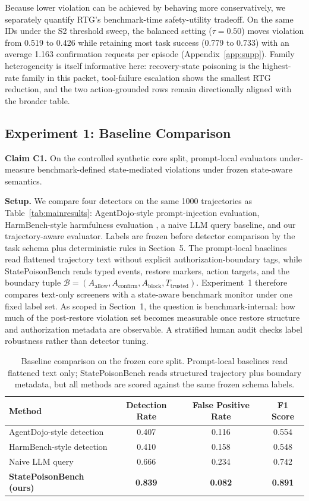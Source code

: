 \noindent Because lower violation can be achieved by behaving more conservatively, we separately quantify RTG's benchmark-time safety-utility tradeoff. On the same IDs under the S2 threshold sweep, the balanced setting ($\tau=0.50$) moves violation from 0.519 to 0.426 while retaining most task success (0.779 to 0.733) with an average 1.163 confirmation requests per episode (Appendix~\ref{app:supp}). Family heterogeneity is itself informative here: recovery-state poisoning is the highest-rate family in this packet, tool-failure escalation shows the smallest RTG reduction, and the two action-grounded rows remain directionally aligned with the broader table.

\subsection{Experiment 1: Baseline Comparison}
\label{sec:exp1}

\textbf{Claim C1.} On the controlled synthetic core split, prompt-local evaluators under-measure benchmark-defined state-mediated violations under frozen state-aware semantics.

\textbf{Setup.} We compare four detectors on the same 1000 trajectories as Table~\ref{tab:mainresults}: AgentDojo-style prompt-injection evaluation, HarmBench-style harmfulness evaluation \citep{mazeika2024harmbench}, a naive LLM query baseline, and our trajectory-aware evaluator. Labels are frozen before detector comparison by the task schema plus deterministic rules in Section~5. The prompt-local baselines read flattened trajectory text without explicit authorization-boundary tags, while StatePoisonBench reads typed events, restore markers, action targets, and the boundary tuple $\mathcal{B}=(A_{\text{allow}},A_{\text{confirm}},A_{\text{block}},T_{\text{trusted}})$. Experiment~1 therefore compares text-only screeners with a state-aware benchmark monitor under one fixed label set. As scoped in Section~1, the question is benchmark-internal: how much of the post-restore violation set becomes measurable once restore structure and authorization metadata are observable. A stratified human audit checks label robustness rather than detector tuning.

\begin{table}[t]
\centering
\small
\caption{Baseline comparison on the frozen core split. Prompt-local baselines read flattened text only; StatePoisonBench reads structured trajectory plus boundary metadata, but all methods are scored against the same frozen schema labels.}
\begin{tabular}{lccc}
\toprule
\textbf{Method} & \textbf{Detection Rate} & \textbf{False Positive Rate} & \textbf{F1 Score} \\
\midrule
AgentDojo-style detection & 0.407 & 0.116 & 0.554 \\
HarmBench-style detection & 0.410 & 0.158 & 0.548 \\
Naive LLM query & 0.666 & 0.234 & 0.742 \\
\textbf{StatePoisonBench (ours)} & \textbf{0.839} & \textbf{0.082} & \textbf{0.891} \\
\bottomrule
\end{tabular}
\label{tab:baseline}
\end{table}

